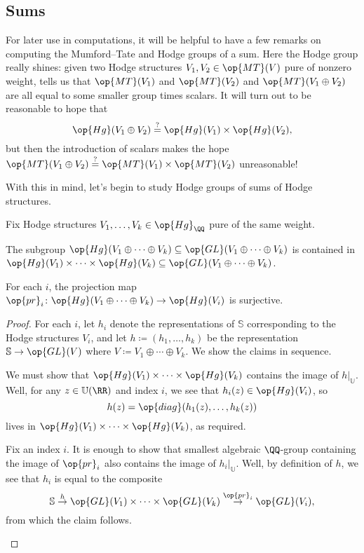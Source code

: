 \documentclass[../thesis.tex]{subfiles}
\begin{document}
\subsection{Sums}
For later use in computations, it will be helpful to have a few remarks on computing the Mumford--Tate and Hodge groups of a sum. Here the Hodge group really shines: given two Hodge structures $V_1,V_2\in\op{MT}(V)$ pure of nonzero weight,  tells us that $\op{MT}(V_1)$ and $\op{MT}(V_2)$ and $\op{MT}(V_1\oplus V_2)$ are all equal to some smaller group times scalars. It will turn out to be reasonable to hope that
\[\op{Hg}(V_1\oplus V_2)\stackrel?=\op{Hg}(V_1)\times\op{Hg}(V_2),\]
but then the introduction of scalars makes the hope $\op{MT}(V_1\oplus V_2)\stackrel?=\op{MT}(V_1)\times\op{MT}(V_2)$ unreasonable!

With this in mind, let's begin to study Hodge groups of sums of Hodge structures.
\begin{lemma} \label{lem:product-of-hg}
	Fix Hodge structures $V_1,\ldots,V_k\in\op{Hg}_\QQ$ pure of the same weight.
	\begin{listalph}
		\item The subgroup $\op{Hg}(V_1\oplus\cdots\oplus V_k)\subseteq\op{GL}(V_1\oplus\cdots\oplus V_k)$ is contained in $\op{Hg}(V_1)\times\cdots\times\op{Hg}(V_k)\subseteq\op{GL}(V_1\oplus\cdots\oplus V_k)$.
		\item For each $i$, the projection map $\op{pr}_i\colon\op{Hg}(V_1\oplus\cdots\oplus V_k)\to\op{Hg}(V_i)$ is surjective.
	\end{listalph}
\end{lemma}
\begin{proof}
	For each $i$, let $h_i$ denote the representations of $\mathbb S$ corresponding to the Hodge structures $V_i$, and let $h\coloneqq (h_1,\ldots,h_k)$ be the representation $\mathbb S\to\op{GL}(V)$ where $V\coloneqq V_1\oplus\cdots\oplus V_k$. We show the claims in sequence.
	\begin{listalph}
		\item We must show that $\op{Hg}(V_1)\times\cdots\times\op{Hg}(V_k)$ contains the image of $h|_{\mathbb U}$. Well, for any $z\in\mathbb U(\RR)$ and index $i$, we see that $h_i(z)\in\op{Hg}(V_i)$, so
		\[h(z)=\op{diag}(h_1(z),\ldots,h_k(z))\]
		lives in $\op{Hg}(V_1)\times\cdots\times\op{Hg}(V_k)$, as required.
		\item Fix an index $i$. It is enough to show that smallest algebraic $\QQ$-group containing the image of $\op{pr}_i$ also contains the image of $h_i|_{\mathbb U}$. Well, by definition of $h$, we see that $h_i$ is equal to the composite
		\[\mathbb S\stackrel{h}\to\op{GL}(V_1)\times\cdots\times\op{GL}(V_k)\stackrel{\op{pr}_i}\to\op{GL}(V_i),\]
		from which the claim follows.
		\qedhere
	\end{listalph}
\end{proof}
\end{document}
